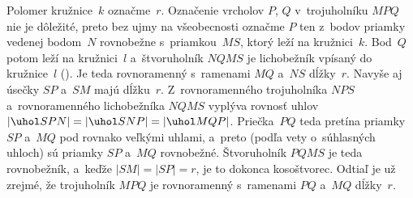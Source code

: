 {%
Polomer kružnice~$k$ označme~$r$. Označenie vrcholov $P$, $Q$ v~trojuholníku $MPQ$
nie je dôležité, preto bez ujmy na všeobecnosti označme $P$ ten z~bodov priamky
vedenej bodom~$N$ rovnobežne s~priamkou~$MS$, ktorý
leží na kružnici~$k$. Bod~$Q$ potom leží na kružnici~$l$ a~štvoruholník $NQMS$ je lichobežník
vpísaný do kružnice~$l$ (\obr). Je teda rovnoramenný s~ramenami $MQ$ a~$NS$ dĺžky~$r$.
Navyše aj úsečky $SP$ a~$SM$ majú dĺžku~$r$. Z~rovnoramenného trojuholníka $NPS$
a~rovnoramenného lichobežníka $NQMS$ vyplýva rovnosť uhlov
$|\uhol SPN|=|\uhol SNP|=|\uhol MQP|$. Priečka~$PQ$ teda pretína
priamky $SP$ a~$MQ$ pod rovnako veľkými uhlami, a~preto (podľa vety o~súhlasných
uhloch) sú priamky $SP$ a~$MQ$ rovnobežné.
Štvoruholník $PQMS$ je teda rovnobežník, a~keďže $|SM|=|SP|= r$, je to
dokonca kosoštvorec.
Odtiaľ je už zrejmé, že trojuholník $MPQ$ je rovnoramenný s~ramenami $PQ$
a~$MQ$ dĺžky~$r$.
%

}
